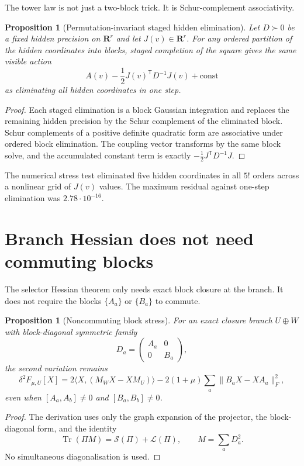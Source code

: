 \documentclass[11pt,a4paper]{article}
\numberwithin{equation}{section}
\DeclareMathOperator{\Tr}{Tr}
\newcommand{\R}{\mathbf R}
\theoremstyle{thmcompact}
\newtheorem{proposition}[theorem]{Proposition}
\theoremstyle{remark}
\begin{document}
The tower law is not just a two-block trick. It is Schur-complement associativity.

\begin{proposition}[Permutation-invariant staged hidden elimination]
\label{prop:permutation-tower}
Let $D\succ0$ be a fixed hidden precision on $\R^r$ and let $J(v)\in\R^r$. For any ordered partition of the hidden coordinates into blocks, staged completion of the square gives the same visible action
\[
A(v)-\frac12J(v)^{\mathsf T}D^{-1}J(v)+\mathrm{const}
\]
as eliminating all hidden coordinates in one step.
\end{proposition}

\begin{proof}
Each staged elimination is a block Gaussian integration and replaces the remaining hidden precision by the Schur complement of the eliminated block. Schur complements of a positive definite quadratic form are associative under ordered block elimination. The coupling vector transforms by the same block solve, and the accumulated constant term is exactly $-\frac12J^{\mathsf T}D^{-1}J$.
\end{proof}

The numerical stress test eliminated five hidden coordinates in all $5!$ orders across a nonlinear grid of $J(v)$ values. The maximum residual against one-step elimination was $2.78\cdot10^{-16}$.

\section{Branch Hessian does not need commuting blocks}

The selector Hessian theorem only needs exact block closure at the branch. It does not require the blocks $\{A_a\}$ or $\{B_a\}$ to commute.

\begin{proposition}[Noncommuting block stress]
\label{prop:noncommuting-hessian-stress}
For an exact closure branch $U\oplus W$ with block-diagonal symmetric family
\[
D_a=
\begin{pmatrix}
A_a&0\\
0&B_a
\end{pmatrix},
\]
the second variation remains
\[
\delta^2F_{\mu,U}[X]
=2\langle X,(M_WX-XM_U)\rangle
-2(1+\mu)\sum_a\|B_aX-XA_a\|_F^2,
\]
even when $[A_a,A_b]\ne0$ and $[B_a,B_b]\ne0$.
\end{proposition}

\begin{proof}
The derivation uses only the graph expansion of the projector, the block-diagonal form, and the identity
\[
\Tr(\Pi M)=\mathcal S(\Pi)+\mathcal L(\Pi),
\qquad M=\sum_aD_a^2.
\]
No simultaneous diagonalisation is used.
\end{proof}
\end{document}
